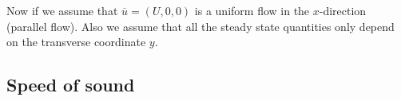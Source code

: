 \documentclass{article}
\begin{document}
Now if we assume that $\overline{u}=(U,0,0)$ is a uniform flow in the $x$-direction (parallel flow). Also we assume that all the steady state quantities only depend on the transverse coordinate $y$.

\subsection{Speed of sound}
\end{document}
